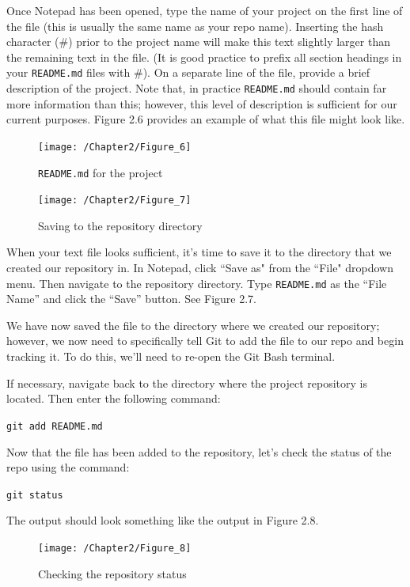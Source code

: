 \documentclass{book}
\begin{document}
Once Notepad has been opened, type the name of your project on the first line of the file (this is usually the same name as your repo name). Inserting the hash character (\#) prior to the project name will make this text slightly larger than the remaining text in the file. (It is good practice to prefix all section headings in your \texttt{README.md} files with \#). On a separate line of the file, provide a brief description of the project. Note that, in practice \texttt{README.md} should contain far more information than this; however, this level of description is sufficient for our current purposes. Figure 2.6 provides an example of what this file might look like.

\begin{figure}[h]
	\caption{\texttt{README.md} for the project}
	\centering\texttt{[image: /Chapter2/Figure\_6]}
\end{figure}

\begin{figure}[h]
	\caption{Saving to the repository directory}
	\centering\texttt{[image: /Chapter2/Figure\_7]}
\end{figure}

When your text file looks sufficient, it's time to save it to the directory that we created our repository in. In Notepad, click ``Save as" from the ``File" dropdown menu. Then navigate to the repository directory. Type \texttt{README.md} as the ``File Name'' and click the ``Save'' button. See Figure 2.7.

We have now saved the file to the directory where we created our repository; however, we now need to specifically tell Git to add the file to our repo and begin tracking it. To do this, we'll need to re-open the Git Bash terminal. 

If necessary, navigate back to the directory where the project repository is located. Then enter the following command:

\texttt{git add README.md}

Now that the file has been added to the repository, let's check the status of the repo using the command:

\texttt{git status}

The output should look something like the output in Figure 2.8. 

\begin{figure}[h]
	\caption{Checking the repository status}
	\centering\texttt{[image: /Chapter2/Figure\_8]}
\end{figure}
\end{document}
